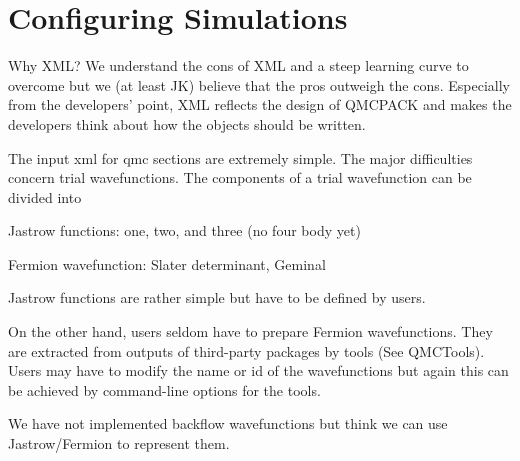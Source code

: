 \chapter{Configuring Simulations}
Why XML? We understand the cons of XML and a steep learning curve to overcome but we (at least JK) believe that the pros outweigh the cons. Especially from the developers' point, XML reflects the design of QMCPACK and makes the developers think about how the objects should be written.

The input xml for qmc sections are extremely simple. The major difficulties concern trial wavefunctions. The components of a trial wavefunction can be divided into
\begin{enumerate*}
\item{} Jastrow functions: one, two, and three (no four body yet)
\item{} Fermion wavefunction: Slater determinant, Geminal 
\end{enumerate*}

Jastrow functions are rather simple but have to be defined by users.

On the other hand, users seldom have to prepare Fermion wavefunctions. They are extracted from outputs of third-party packages by tools (See QMCTools). Users may have to modify the name or id of the wavefunctions but again this can be achieved by command-line options for the tools.

We have not implemented backflow wavefunctions but think we can use Jastrow/Fermion to represent them. 

